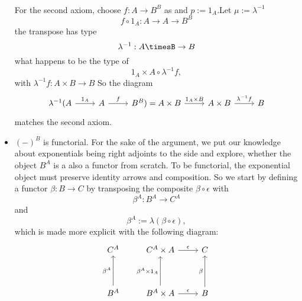 \begin{itemize}
   \\ For the second axiom, choose $f:A\to B^B$ as and $p:=1_A$.Let $\mu := \lambda^{-1}$
   $$f \circ 1_A : A \to A \to B^B$$
   the transpose has type
   $$\lambda^{-1}: A\timesB \to B $$
   what happens to be the type of
   $$1_A \times A \circ \lambda^{-1} f,$$ with
   $\lambda^{-1}f : A\times B \to B$
   So the diagram
   \[
   \begin{tikzcd}[column sep=normal]
     \lambda^{-1}(A \arrow{r}{1_A} & A \arrow{r}{f} & B^B) = A \times B \arrow{r}{1_A \times B} & A \times B \arrow{r}{\lambda^{-1} f} & B 
   \end{tikzcd}
   \]
   matches the second axiom.

\item $ (-)^B$ is functorial.
  For the sake of the argument, we put our knowledge about exponentials being right adjoints to the side and explore, whether the object $B^A$ is a also a functor from scratch.
  To be functorial, the exponential object must preserve identity arrows and composition.
  So we start by defining a functor $\beta:B \to C$ by transposing the composite $\beta \circ \epsilon$ with
  $$ \beta^A: B^A \to C^A$$
  and
  $$ \beta^A := \lambda (\beta \circ \epsilon),$$
  which is made more explicit with the following diagram:
\[
\begin{tikzcd}[row sep=huge]
    C^A                    & C^A \times A \arrow{r}{\epsilon} & C \\
    B^A \arrow{u}{\beta^A} & B^A \times A \arrow{u}{\beta^A \times 1_A} \arrow{r}{\epsilon} & B \arrow{u}{\beta}
  \end{tikzcd}
  \]


\end{itemize}
